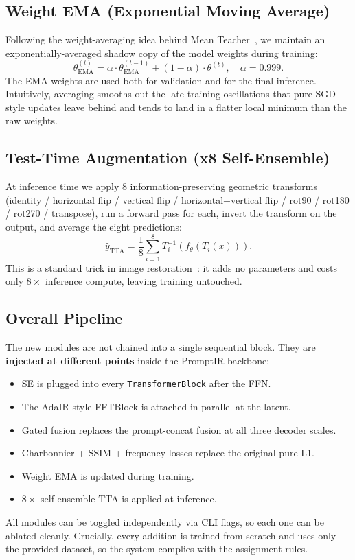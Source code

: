 \documentclass[12pt, a4paper]{article}
\begin{document}
\subsection{Weight EMA (Exponential Moving Average)}
Following the weight-averaging idea behind Mean Teacher~\cite{tarvainen2017meanteacher}, we maintain an exponentially-averaged shadow copy of the model weights during training:
\begin{equation}
\theta_{\text{EMA}}^{(t)} = \alpha \cdot \theta_{\text{EMA}}^{(t-1)} + (1-\alpha) \cdot \theta^{(t)},\quad \alpha = 0.999.
\end{equation}
The EMA weights are used both for validation and for the final inference. Intuitively, averaging smooths out the late-training oscillations that pure SGD-style updates leave behind and tends to land in a flatter local minimum than the raw weights.

\subsection{Test-Time Augmentation (x8 Self-Ensemble)}
At inference time we apply 8 information-preserving geometric transforms (identity / horizontal flip / vertical flip / horizontal+vertical flip / rot90 / rot180 / rot270 / transpose), run a forward pass for each, invert the transform on the output, and average the eight predictions:
\begin{equation}
\hat{y}_{\text{TTA}} = \frac{1}{8} \sum_{i=1}^{8} T_i^{-1}\!\left(f_\theta(T_i(x))\right).
\end{equation}
This is a standard trick in image restoration~\cite{lim2017edsr}: it adds no parameters and costs only $8\times$ inference compute, leaving training untouched.

\subsection{Overall Pipeline}
The new modules are not chained into a single sequential block. They are \textbf{injected at different points} inside the PromptIR backbone:
\begin{itemize}
    \item SE is plugged into every \texttt{TransformerBlock} after the FFN.
    \item The AdaIR-style FFTBlock is attached in parallel at the latent.
    \item Gated fusion replaces the prompt-concat fusion at all three decoder scales.
    \item Charbonnier + SSIM + frequency losses replace the original pure L1.
    \item Weight EMA is updated during training.
    \item $8\times$ self-ensemble TTA is applied at inference.
\end{itemize}
All modules can be toggled independently via CLI flags, so each one can be ablated cleanly. Crucially, every addition is trained from scratch and uses only the provided dataset, so the system complies with the assignment rules.
\end{document}
